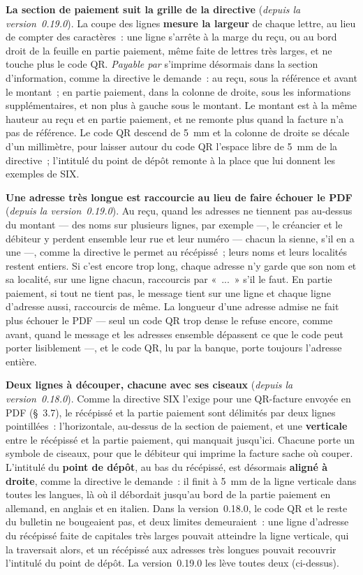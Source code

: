 \documentclass[a4paper,11pt,oneside]{article}
\begin{document}
\textbf{La section de paiement suit la grille de la directive} (\emph{depuis la version~0.19.0}). La coupe des lignes \textbf{mesure la largeur} de chaque lettre, au lieu de compter des caractères~: une ligne s'arrête à la marge du reçu, ou au bord droit de la feuille en partie paiement, même faite de lettres très larges, et ne touche plus le code QR. \emph{Payable par} s'imprime désormais dans la section d'information, comme la directive le demande~: au reçu, sous la référence et avant le montant~; en partie paiement, dans la colonne de droite, sous les informations supplémentaires, et non plus à gauche sous le montant. Le montant est à la même hauteur au reçu et en partie paiement, et ne remonte plus quand la facture n'a pas de référence. Le code QR descend de 5~mm et la colonne de droite se décale d'un millimètre, pour laisser autour du code QR l'espace libre de 5~mm de la directive~; l'intitulé du point de dépôt remonte à la place que lui donnent les exemples de SIX.

\textbf{Une adresse très longue est raccourcie au lieu de faire échouer le PDF} (\emph{depuis la version~0.19.0}). Au reçu, quand les adresses ne tiennent pas au-dessus du montant --- des noms sur plusieurs lignes, par exemple ---, le créancier et le débiteur y perdent ensemble leur rue et leur numéro --- chacun la sienne, s'il en a une ---, comme la directive le permet au récépissé~; leurs noms et leurs localités restent entiers. Si c'est encore trop long, chaque adresse n'y garde que son nom et sa localité, sur une ligne chacun, raccourcis par «~...~» s'il le faut. En partie paiement, si tout ne tient pas, le message tient sur une ligne et chaque ligne d'adresse aussi, raccourcis de même. La longueur d'une adresse admise ne fait plus échouer le PDF --- seul un code QR trop dense le refuse encore, comme avant, quand le message et les adresses ensemble dépassent ce que le code peut porter lisiblement ---, et le code QR, lu par la banque, porte toujours l'adresse entière.

\textbf{Deux lignes à découper, chacune avec ses ciseaux} (\emph{depuis la version~0.18.0}). Comme la directive SIX l'exige pour une QR-facture envoyée en PDF (\S~3.7), le récépissé et la partie paiement sont délimités par deux lignes pointillées~: l'horizontale, au-dessus de la section de paiement, et une \textbf{verticale} entre le récépissé et la partie paiement, qui manquait jusqu'ici. Chacune porte un symbole de ciseaux, pour que le débiteur qui imprime la facture sache où couper. L'intitulé du \textbf{point de dépôt}, au bas du récépissé, est désormais \textbf{aligné à droite}, comme la directive le demande~: il finit à 5~mm de la ligne verticale dans toutes les langues, là où il débordait jusqu'au bord de la partie paiement en allemand, en anglais et en italien. Dans la version~0.18.0, le code QR et le reste du bulletin ne bougeaient pas, et deux limites demeuraient~: une ligne d'adresse du récépissé faite de capitales très larges pouvait atteindre la ligne verticale, qui la traversait alors, et un récépissé aux adresses très longues pouvait recouvrir l'intitulé du point de dépôt. La version~0.19.0 les lève toutes deux (ci-dessus).
\end{document}
